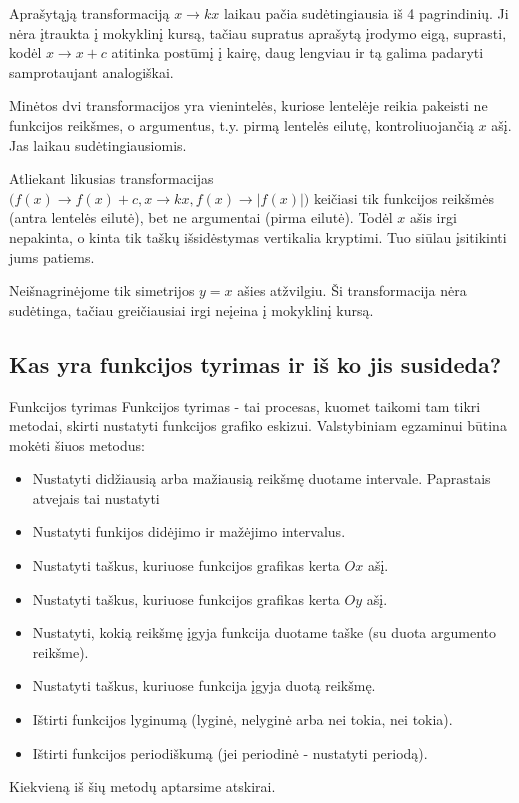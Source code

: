 \documentclass{article}
\begin{document}
Aprašytąją transformaciją $x \to kx$ laikau pačia sudėtingiausia iš 4 pagrindinių. Ji nėra įtraukta į mokyklinį kursą, tačiau supratus aprašytą įrodymo eigą, suprasti, kodėl $x \to x+c$ atitinka postūmį į kairę, daug lengviau ir tą galima padaryti samprotaujant analogiškai.

Minėtos dvi transformacijos yra vienintelės, kuriose lentelėje reikia pakeisti ne funkcijos reikšmes, o argumentus, t.y. pirmą lentelės eilutę, kontroliuojančią $x$ ašį. Jas laikau sudėtingiausiomis.

Atliekant likusias transformacijas $\Big(f(x) \rightarrow f(x)+c, x \rightarrow kx, f(x) \rightarrow |f(x)|\Big)$ keičiasi tik funkcijos reikšmės (antra lentelės eilutė), bet ne argumentai (pirma eilutė). Todėl $x$ ašis irgi nepakinta, o kinta tik taškų išsidėstymas vertikalia kryptimi. Tuo siūlau įsitikinti jums patiems.

Neišnagrinėjome tik simetrijos $y=x$ ašies atžvilgiu. Ši transformacija nėra sudėtinga, tačiau greičiausiai irgi neįeina į mokyklinį kursą.

\subsection*{Kas yra funkcijos tyrimas ir iš ko jis susideda?}
\begin{mybox}{Funkcijos tyrimas}
Funkcijos tyrimas - tai procesas, kuomet taikomi tam tikri metodai, skirti nustatyti funkcijos grafiko eskizui. Valstybiniam egzaminui būtina mokėti šiuos metodus:
\begin{itemize}
\item Nustatyti didžiausią arba mažiausią reikšmę duotame intervale.
Paprastais atvejais tai nustatyti 
\item Nustatyti funkijos didėjimo ir mažėjimo intervalus.
\item Nustatyti taškus, kuriuose funkcijos grafikas kerta $Ox$ ašį.
\item Nustatyti taškus, kuriuose funkcijos grafikas kerta $Oy$ ašį.
\item Nustatyti, kokią reikšmę įgyja funkcija duotame taške (su duota argumento reikšme).
\item Nustatyti taškus, kuriuose funkcija įgyja duotą reikšmę.
\item Ištirti funkcijos lyginumą (lyginė, nelyginė arba nei tokia, nei tokia).
\item Ištirti funkcijos periodiškumą (jei periodinė - nustatyti periodą).
\end{itemize}
\end{mybox}
Kiekvieną iš šių metodų aptarsime atskirai. 
\end{document}
